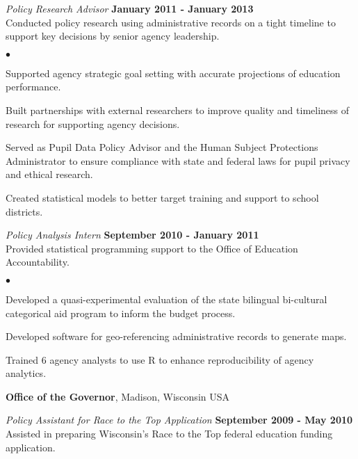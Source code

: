 \documentclass[margin,line]{res}
\newenvironment{list2}{
  \begin{list}{$\bullet$}{%
      \setlength{\itemsep}{0in}
      \setlength{\parsep}{0in} \setlength{\parskip}{0in}
      \setlength{\topsep}{0in} \setlength{\partopsep}{0in} 
      \setlength{\leftmargin}{0.2in}}}{\end{list}}
\begin{document}
\begin{resume}
\vspace*{-.3cm}
{\em Policy Research Advisor} \hfill {\bf January 2011 - January 2013} \\
Conducted policy research using administrative records on a tight timeline to 
support key decisions by senior agency leadership. \\

\vspace*{-2mm}

\begin{list2}
\item Supported agency strategic goal setting with accurate projections of education performance.
\item Built partnerships with external researchers to improve quality and 
timeliness of research for supporting agency decisions.
\item Served as Pupil Data Policy Advisor and the Human Subject Protections 
Administrator to ensure compliance with state and federal laws for pupil privacy 
and ethical research.
\item Created statistical models to better target training and support to school districts.
\end{list2}

\vspace{-.3cm}
{\em Policy Analysis Intern} \hfill {\bf September 2010 - January 2011}\\
Provided statistical programming support to the Office of Education Accountability.
\begin{list2}
\item Developed a quasi-experimental evaluation of the state bilingual bi-cultural 
categorical aid program to inform the budget process.
\item Developed software for geo-referencing administrative records to generate 
maps.
\item Trained 6 agency analysts to use R to enhance reproducibility of agency analytics. 
\end{list2}
\vspace{-.1cm}

{\bf Office of the Governor}, Madison, Wisconsin USA

\vspace{-.3cm}
{\em Policy Assistant for Race to the Top Application} \hfill {\bf September 2009 - May 2010}\\
Assisted in preparing Wisconsin's Race to the Top federal education funding 
application. 


\end{resume}
\end{document}
